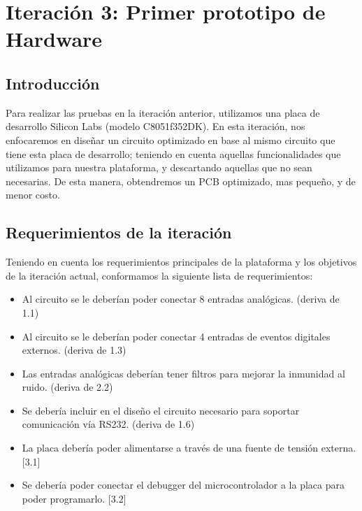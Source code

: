 \chapter{Iteración 3: Primer prototipo de Hardware} %
\label{cha:iteracion_3}


\section{Introducción} %
\label{it3:sec:introduccion}

Para realizar las pruebas en la iteración anterior, utilizamos una placa de desarrollo Silicon Labs (modelo C8051f352DK). En esta iteración, nos enfocaremos en diseñar un circuito optimizado en base al mismo circuito que tiene esta placa de desarrollo; teniendo en cuenta aquellas funcionalidades que utilizamos para nuestra plataforma, y descartando aquellas que no sean necesarias. De esta manera, obtendremos un PCB optimizado, mas pequeño, y de menor costo.




\section{Requerimientos de la iteración} %
\label{it3:sec:requerimientos_de_la_iteracion}

Teniendo en cuenta los requerimientos principales de la plataforma y los objetivos de la iteración actual, conformamos la siguiente lista de requerimientos:

\begin{itemize}
\item Al circuito se le deberían poder conectar 8 entradas analógicas. (deriva de 1.1)
\item Al circuito se le deberían poder conectar 4 entradas de eventos digitales externos. (deriva de 1.3)
\item Las entradas analógicas deberían tener filtros para mejorar la inmunidad al ruido. (deriva de 2.2)
\item Se debería incluir en el diseño el circuito necesario para soportar comunicación vía RS232. (deriva de 1.6)
\item La placa debería poder alimentarse a través de una fuente de tensión externa. [3.1]
\item Se debería poder conectar el debugger del microcontrolador a la placa para poder programarlo. [3.2]
\end{itemize}



